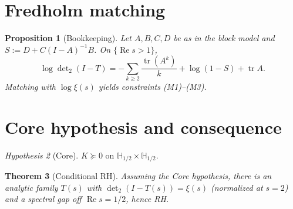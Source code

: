 \documentclass[11pt]{article}
\newcommand{\ReS}{\operatorname{Re}}
\newcommand{\Hhp}{\mathbb{H}_{1/2}}
\newcommand{\detTwo}{\det\nolimits_{2}}
\newcommand{\xiFun}{\xi}
\theoremstyle{plain}
\newtheorem{theorem}{Theorem}
\newtheorem{proposition}[theorem]{Proposition}
\theoremstyle{definition}
\theoremstyle{remark}
\newtheorem{hypothesis}[theorem]{Hypothesis}
\begin{document}
\section{Fredholm matching}
\begin{proposition}[Bookkeeping]
Let $A,B,C,D$ be as in the block model and $S:=D+C(I-A)^{-1}B$. On $\{\ReS s>1\}$,
\[
\log \detTwo(I-T)= -\sum_{k\ge2}\frac{\operatorname{tr}(A^k)}{k} + \log(1-S)+ \operatorname{tr}A.
\]
Matching with $\log \xiFun(s)$ yields constraints (M1)--(M3).
\end{proposition}

\section{Core hypothesis and consequence}
\begin{hypothesis}[Core]
$K\succeq 0$ on $\Hhp\times\Hhp$.
\end{hypothesis}

\begin{theorem}[Conditional RH]
Assuming the Core hypothesis, there is an analytic family $T(s)$ with $\detTwo(I-T(s))=\xiFun(s)$ (normalized at $s=2$) and a spectral gap off $\ReS s=1/2$, hence RH.
\end{theorem}
\end{document}
